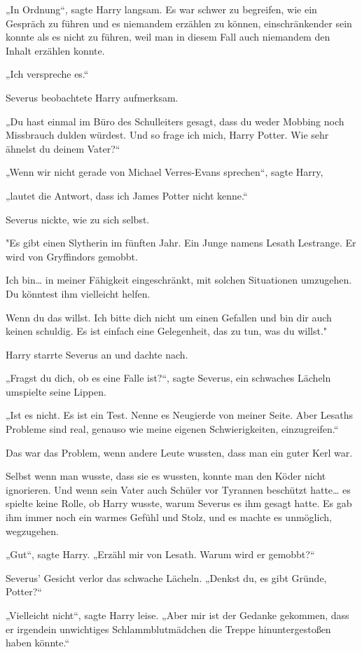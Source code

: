 {„In Ordnung“, sagte Harry langsam. Es war schwer zu begreifen, wie ein Gespräch zu führen und es niemandem erzählen zu können, einschränkender sein konnte als es nicht zu führen, weil man in diesem Fall auch niemandem den Inhalt erzählen konnte.

„Ich verspreche es.“

Severus beobachtete Harry aufmerksam.

„Du hast einmal im Büro des Schulleiters gesagt, dass du weder Mobbing noch Missbrauch dulden würdest. Und so frage ich mich, Harry Potter. Wie sehr ähnelst du deinem Vater?“

„Wenn wir nicht gerade von Michael Verres-Evans sprechen“, sagte Harry,

„lautet die Antwort, dass ich James Potter nicht kenne.“

Severus nickte, wie zu sich selbst.

"Es gibt einen Slytherin im fünften Jahr. Ein Junge namens Lesath Lestrange. Er wird von Gryffindors gemobbt.

Ich bin… in meiner Fähigkeit eingeschränkt, mit solchen Situationen umzugehen. Du könntest ihm vielleicht helfen.

Wenn du das willst. Ich bitte dich nicht um einen Gefallen und bin dir auch keinen schuldig. Es ist einfach eine Gelegenheit, das zu tun, was du willst."

Harry starrte Severus an und dachte nach.

„Fragst du dich, ob es eine Falle ist?“, sagte Severus, ein schwaches Lächeln umspielte seine Lippen.

„Ist es nicht. Es ist ein Test. Nenne es Neugierde von meiner Seite. Aber Lesaths Probleme sind real, genauso wie meine eigenen Schwierigkeiten, einzugreifen.“

Das war das Problem, wenn andere Leute wussten, dass man ein guter Kerl war.

Selbst wenn man wusste, dass sie es wussten, konnte man den Köder nicht ignorieren. Und wenn sein Vater auch Schüler vor Tyrannen beschützt hatte… es spielte keine Rolle, ob Harry wusste, warum Severus es ihm gesagt hatte. Es gab ihm immer noch ein warmes Gefühl und Stolz, und es machte es unmöglich, wegzugehen.

„Gut“, sagte Harry. „Erzähl mir von Lesath. Warum wird er gemobbt?“

Severus' Gesicht verlor das schwache Lächeln. „Denkst du, es gibt Gründe, Potter?“

„Vielleicht nicht“, sagte Harry leise. „Aber mir ist der Gedanke gekommen, dass er irgendein unwichtiges Schlammblutmädchen die Treppe hinuntergestoßen haben könnte.“

}
